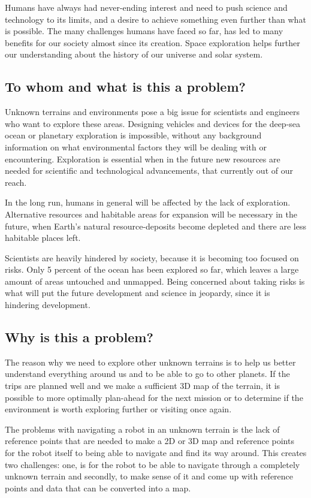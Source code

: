 Humans have always had never-ending interest and need to push science and technology to its limits, and a desire to achieve something even further than what is possible. The many challenges humans have faced so far, has led to many benefits for our society almost since its creation. Space exploration helps further our understanding about the history of our universe and solar system\cite{whyweexplo}.

\subsection{To whom and what is this a problem?}
Unknown terrains and environments pose a big issue for scientists and engineers who want to explore these areas. Designing vehicles and devices for the deep-sea ocean or planetary exploration is impossible, without any background information on what environmental factors they will be dealing with or encountering. Exploration is essential when in the future new resources are needed for scientific and technological advancements, that currently out of our reach.

In the long run, humans in general will be affected by the lack of exploration. Alternative resources and habitable areas for expansion will be necessary in the future, when Earth's natural resource-deposits become depleted and there are less habitable places left. 

Scientists are heavily hindered by society, because it is becoming too focused on risks. Only 5 percent of the ocean has been explored so far, which leaves a large amount of areas untouched and unmapped. Being concerned about taking risks is what will put the future development and science in jeopardy, since it is hindering development\cite{risksandexplo}. 

\subsection{Why is this a problem?}
The reason why we need to explore other unknown terrains is to help us better understand everything around us and to be able to go to other planets. 
If the trips are planned well and we make a sufficient 3D map of the terrain, it is possible to more optimally plan-ahead for the next mission or to determine if the environment is worth exploring further or visiting once again. 

The problems with navigating a robot in an unknown terrain is the lack of reference points that are needed to make a 2D or 3D map and reference points for the robot itself to being able to navigate and find its way around. This creates two challenges: one, is for the robot to be able to navigate through a completely unknown terrain and secondly, to make sense of it and come up with reference points and data that can be converted into a map.


